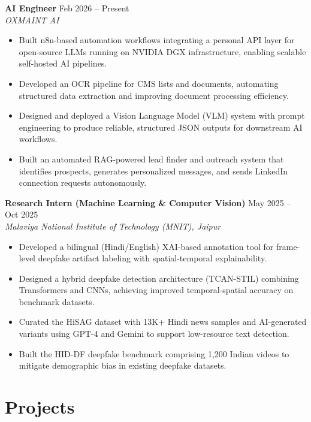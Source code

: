 \documentclass[a4paper,10pt]{article}
\begin{document}
\textbf{AI Engineer} \hfill Feb 2026 -- Present \\
\textit{OXMAINT AI}
\begin{itemize}[noitemsep, leftmargin=*, topsep=2pt]
    \item Built n8n-based automation workflows integrating a personal API layer for open-source LLMs running on NVIDIA DGX infrastructure, enabling scalable self-hosted AI pipelines.
    \item Developed an OCR pipeline for CMS lists and documents, automating structured data extraction and improving document processing efficiency.
    \item Designed and deployed a Vision Language Model (VLM) system with prompt engineering to produce reliable, structured JSON outputs for downstream AI workflows.
    \item Built an automated RAG-powered lead finder and outreach system that identifies prospects, generates personalized messages, and sends LinkedIn connection requests autonomously.
\end{itemize}

\vspace{2pt}

\textbf{Research Intern (Machine Learning \& Computer Vision)} \hfill May 2025 -- Oct 2025 \\
\textit{Malaviya National Institute of Technology (MNIT), Jaipur}
\begin{itemize}[noitemsep, leftmargin=*, topsep=2pt]
    \item Developed a bilingual (Hindi/English) XAI-based annotation tool for frame-level deepfake artifact labeling with spatial-temporal explainability.
    \item Designed a hybrid deepfake detection architecture (TCAN-STIL) combining Transformers and CNNs, achieving improved temporal-spatial accuracy on benchmark datasets.
    \item Curated the HiSAG dataset with 13K+ Hindi news samples and AI-generated variants using GPT-4 and Gemini to support low-resource text detection.
    \item Built the HID-DF deepfake benchmark comprising 1,200 Indian videos to mitigate demographic bias in existing deepfake datasets.
\end{itemize}

\section{Projects}
\end{document}
